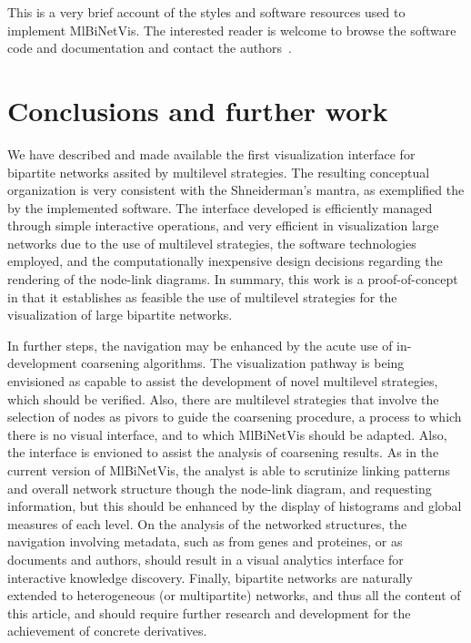 \documentclass[runningheads]{llncs}
\begin{document}
This is a very brief account of the styles and software resources used to implement
MlBiNetVis. The interested reader is welcome to browse the software code and documentation
and contact the authors~\cite{mbnvcode}.



\section{Conclusions and further work}\label{con}
We have described and made available the first visualization interface for bipartite networks
assited by multilevel strategies.
The resulting conceptual organization is very consistent with the Shneiderman's mantra,
as exemplified the by the implemented software.
The interface developed is efficiently managed through simple interactive operations,
and very efficient in visualization large networks due to the use of multilevel strategies,
the software technologies employed, and the computationally inexpensive design decisions regarding
the rendering of the node-link diagrams.
In summary, this work is a proof-of-concept in that it establishes as feasible the use
of multilevel strategies for the visualization of large bipartite networks.

In further steps, the navigation may be enhanced by the acute use of in-development coarsening algorithms.
The visualization pathway is being envisioned as capable to assist the development of novel
multilevel strategies, which should be verified.
Also, there are multilevel strategies that involve the selection of nodes as pivors
to guide the coarsening procedure, a process to which there is no visual interface,
and to which MlBiNetVis should be adapted.
Also, the interface is envioned to assist the analysis of coarsening results. As in the current version of MlBiNetVis,
the analyst is able to scrutinize linking patterns and overall network structure though the node-link diagram,
and requesting information, but this should be enhanced by the display of histograms and global measures of each level.
On the analysis of the networked structures, the navigation involving metadata, such as from genes and proteines, or as
documents and authors, should result in a visual analytics interface for interactive knowledge discovery.
Finally, bipartite networks are naturally extended to heterogeneous (or multipartite) networks,
and thus all the content of this article, and should require further research and development for the achievement
of concrete derivatives.
\end{document}
